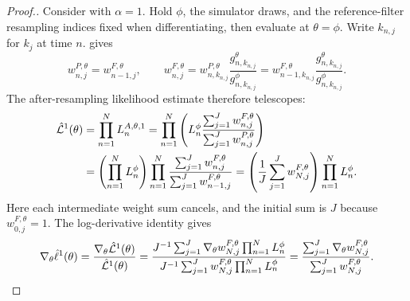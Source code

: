 \begin{proof}[Proof.]
Consider  with $\alpha=1$. Hold $\phi$, the simulator draws,
and the reference-filter resampling indices fixed when differentiating,
then evaluate at $\theta=\phi$. Write $k_{n,j}$ for $k_j$ at time $n$.
 gives
\begin{equation}
w_{n,j}^{P,\theta}=w_{n-1,j}^{F,\theta},\qquad
w_{n,j}^{F,\theta}
=w_{n,k_{n,j}}^{P,\theta}\frac{g_{n,k_{n,j}}^\theta}{g_{n,k_{n,j}}^\phi}
=w_{n-1,k_{n,j}}^{F,\theta}\frac{g_{n,k_{n,j}}^\theta}{g_{n,k_{n,j}}^\phi}.
\label{eq:lemma-s1-filtered-recursion}
\end{equation}
The after-resampling likelihood estimate therefore telescopes:
\begin{align}
\hat{\mathcal{L}}^1(\theta)
&=\prod_{n=1}^N L_n^{A,\theta,1}
 =\prod_{n=1}^N\left(L_n^\phi
 \frac{\sum_{j=1}^Jw_{n,j}^{F,\theta}}{\sum_{j=1}^Jw_{n,j}^{P,\theta}}\right)
 \notag\\*
&=\left(\prod_{n=1}^N L_n^\phi\right)
 \prod_{n=1}^N\frac{\sum_{j=1}^Jw_{n,j}^{F,\theta}}
                       {\sum_{j=1}^Jw_{n-1,j}^{F,\theta}}
 =\left(\frac1J\sum_{j=1}^Jw_{N,j}^{F,\theta}\right)
  \prod_{n=1}^N L_n^\phi.
\label{eq:lemma-s1-telescoping}
\end{align}
Here each intermediate weight sum cancels, and the initial sum is $J$
because $w_{0,j}^{F,\theta}=1$. The log-derivative identity gives
\begin{equation}
\nabla_\theta\hat\ell^1(\theta)
=\frac{\nabla_\theta\hat{\mathcal{L}}^1(\theta)}{\hat{\mathcal{L}}^1(\theta)}
=\frac{J^{-1}\sum_{j=1}^J\nabla_\theta w_{N,j}^{F,\theta}
       \prod_{n=1}^N L_n^\phi}
       {J^{-1}\sum_{j=1}^Jw_{N,j}^{F,\theta}
       \prod_{n=1}^N L_n^\phi}
=\frac{\sum_{j=1}^J\nabla_\theta w_{N,j}^{F,\theta}}
       {\sum_{j=1}^Jw_{N,j}^{F,\theta}}.
\label{eq:log-derivative-identity}
\end{equation}


\end{proof}
